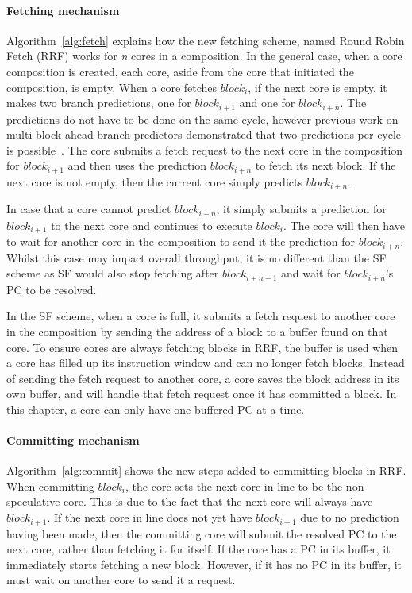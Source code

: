 \paragraph*{Fetching mechanism}
Algorithm~\ref{alg:fetch} explains how the new fetching scheme, named Round Robin Fetch (RRF) works for \textit{n} cores in a composition.
In the general case, when a core composition is created, each core, aside from the core that initiated the composition, is empty.
When a core fetches $block_i$, if the next core is empty, it makes two branch predictions, one for $block_{i+1}$ and one for $block_{i+n}$.
The predictions do not have to be done on the same cycle, however previous work on multi-block ahead branch predictors demonstrated that two predictions per cycle is possible~\cite{SeznecMultipleBlock}.
The core submits a fetch request to the next core in the composition for $block_{i+1}$ and then uses the prediction $block_{i+n}$ to fetch its next block.
If the next core is not empty, then the current core simply predicts $block_{i+n}$.

In case that a core cannot predict $block_{i+n}$, it simply submits a prediction for $block_{i+1}$ to the next core and continues to execute $block_{i}$.
The core will then have to wait for another core in the composition to send it the prediction for $block_{i+n}$.
Whilst this case may impact overall throughput, it is no different than the SF scheme as SF would also stop fetching after $block_{i+n-1}$ and wait for $block_{i+n}$'s PC to be resolved.

In the SF scheme, when a core is full, it submits a fetch request to another core in the composition by sending the address of a block to a buffer found on that core.
To ensure cores are always fetching blocks in RRF, the buffer is used when a core has filled up its instruction window and can no longer fetch blocks.
Instead of sending the fetch request to another core, a core saves the block address in its own buffer, and will handle that fetch request once it has committed a block.
In this chapter, a core can only have one buffered PC at a time.

\paragraph*{Committing mechanism}
Algorithm~\ref{alg:commit} shows the new steps added to committing blocks in RRF.
When committing $block_i$, the core sets the next core in line to be the non-speculative core.
This is due to the fact that the next core will always have $block_{i+1}$.
If the next core in line does not yet have $block_{i+1}$ due to no prediction having been made, then the committing core will submit the resolved PC to the next core, rather than fetching it for itself.
If the core has a PC in its buffer, it immediately starts fetching a new block.
However, if it has no PC in its buffer, it must wait on another core to send it a request.

